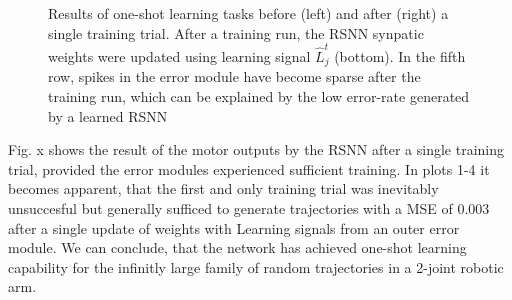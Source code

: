 \documentclass[letterpaper, 10 pt, conference]{ieeeconf}  %
\begin{document}
\begin{figure}[thpb]
        \centering
\caption{Results of one-shot learning tasks before (left) and after (right) a single training trial. After a training run, the RSNN 
synpatic weights were updated using learning signal $\hat{L}^t_j$ (bottom). In the fifth row, spikes in the error module have become sparse after
the training run, which can be explained by the low error-rate generated by a learned RSNN \cite{bellecBiologicallyInspiredAlternatives2019}}
        \label{figurelabel}
        \end{figure}

Fig. x shows the result of the motor outputs by the RSNN after a single training trial, provided the error modules experienced sufficient training.
In plots 1-4 it becomes apparent, that the first and only training trial was inevitably unsuccesful but generally sufficed to generate trajectories
 with a MSE of 0.003 after a single update of weights with Learning signals from an outer error module. We can 
conclude, that the network has achieved one-shot learning capability for the infinitly large family of random trajectories in a 2-joint robotic arm.
\end{document}
